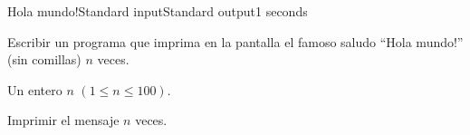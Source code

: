 \begin{problem}{Hola mundo!}{Standard input}{Standard output}{1 seconds}


Escribir un programa que imprima en la pantalla el famoso saludo ``Hola mundo!'' (sin comillas) $n$ veces.

\InputFile
Un entero $n$ $(1\leq n \leq 100)$.

\OutputFile
Imprimir el mensaje $n$ veces.

\Example

\begin{example}
\end{example}

\end{problem}
